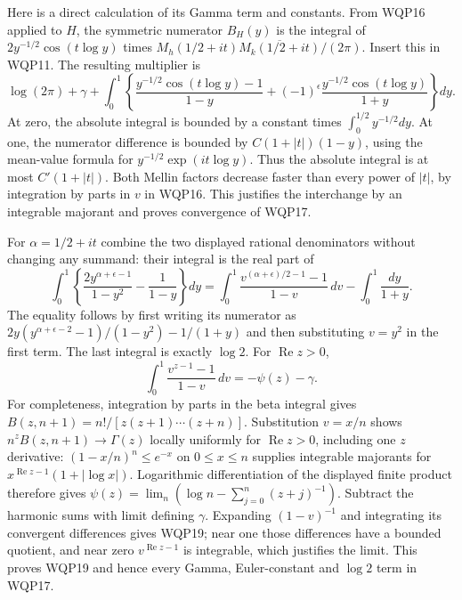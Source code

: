 Here is a direct calculation of its Gamma term and constants.
From WQP16 applied to $H$, the symmetric numerator $B_H(y)$
is the integral of
$2y^{-1/2}\cos(t\log y)$ times
$M_h(1/2+it)\overline{M_k(1/2+it)}/(2\pi)$.
Insert this in WQP11. The resulting multiplier is
\begin{equation}\tag{WQP18}
 \log(2\pi)+\gamma+
 \int_0^1\left\{
       \frac{y^{-1/2}\cos(t\log y)-1}{1-y}
       +(-1)^\epsilon
          \frac{y^{-1/2}\cos(t\log y)}{1+y}\right\}dy .
\end{equation}
At zero, the absolute integral is bounded by a constant times
$\int_0^{1/2}y^{-1/2}dy$. At one, the numerator difference is
bounded by $C(1+|t|)(1-y)$, using the mean-value formula
for $y^{-1/2}\exp(it\log y)$. Thus the absolute integral is
at most $C'(1+|t|)$. Both Mellin factors decrease faster than
every power of $|t|$, by integration by parts in $v$ in
WQP16. This justifies the interchange by an integrable
majorant and proves convergence of WQP17.

For $\alpha=1/2+it$ combine the two displayed rational
denominators without changing any summand: their integral
is the real part of
\[
 \int_0^1\left\{\frac{2y^{\alpha+\epsilon-1}}{1-y^2}
                              -\frac1{1-y}\right\}dy
 =\int_0^1\frac{v^{(\alpha+\epsilon)/2-1}-1}{1-v}\,dv
                                  -\int_0^1\frac{dy}{1+y}.
\]
The equality follows by first writing its numerator as
$2y(y^{\alpha+\epsilon-2}-1)/(1-y^2)-1/(1+y)$ and
then substituting $v=y^2$ in the first term. The last
integral is exactly $\log2$.
For $\operatorname{Re}z>0$,
\begin{equation}\tag{WQP19}
 \int_0^1\frac{v^{z-1}-1}{1-v}\,dv=-\psi(z)-\gamma .
\end{equation}
For completeness, integration by parts in the beta integral gives
$B(z,n+1)=n!/[z(z+1)\cdots(z+n)]$. Substitution $v=x/n$
shows $n^zB(z,n+1)\to\Gamma(z)$ locally uniformly for
$\operatorname{Re}z>0$, including one $z$ derivative:
$(1-x/n)^n\le e^{-x}$ on $0\le x\le n$ supplies integrable
majorants for $x^{\operatorname{Re}z-1}(1+|\log x|)$.
Logarithmic differentiation of the displayed finite product
therefore gives
$\psi(z)=\lim_n(\log n-\sum_{j=0}^n(z+j)^{-1})$.
Subtract the harmonic sums with limit defining $\gamma$.
Expanding $(1-v)^{-1}$ and integrating its convergent
differences gives WQP19; near one those differences have a
bounded quotient, and near zero $v^{\operatorname{Re}z-1}$
is integrable, which justifies the limit. This proves WQP19
and hence every Gamma, Euler-constant and $\log2$ term in WQP17.

